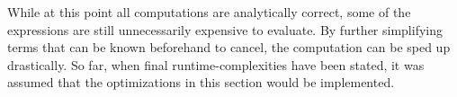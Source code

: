 While at this point all computations are analytically correct, some of the expressions are still unnecessarily expensive to evaluate.
By further simplifying terms that can be known beforehand to cancel, the computation can be sped up drastically.
So far, when final runtime-complexities have been stated, it was assumed that the optimizations in this section would be implemented.
